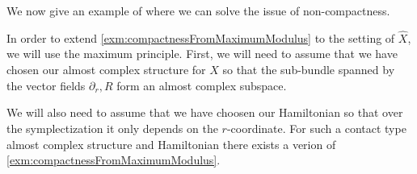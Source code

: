 We now give an example of where we can solve the issue of non-compactness.

In order to extend \cref{exm:compactnessFromMaximumModulus} to the setting of $\hat X$, we will use the maximum principle. First, we will need to assume that we have chosen our almost complex structure for $\hat X$ so that the sub-bundle spanned by the vector fields $\partial_r, R$ form an almost complex subspace.

We will also need to assume that we have choosen our Hamiltonian so that over the symplectization it only depends on the $r$-coordinate.
For such a contact type almost complex structure and Hamiltonian there exists a verion of \cref{exm:compactnessFromMaximumModulus}.

